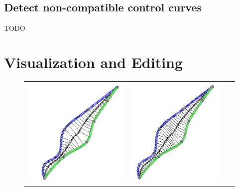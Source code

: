 \documentclass[journal, letterpaper]{IEEEtran}
\begin{document}
\subsection{Detect non-compatible control curves}
TODO

\section{Visualization and Editing}\label{chapter:Visual}

\begin{figure} %
	\centering
		\begin{tabular}{cccc}
			\includegraphics[scale=0.4]{images/NoGeodesicSampling.png} & \includegraphics[scale=0.4]{images/GeodesicSampling.png} 

\end{tabular}
\end{figure}
\end{document}
